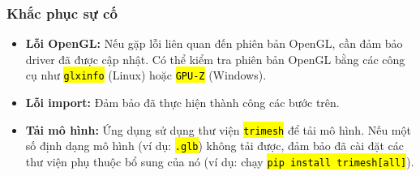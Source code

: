 \documentclass[a4paper]{article}
\newcommand{\code}[1]{\hl{\texttt{#1}}}
\begin{document}
\subsubsection{Khắc phục sự cố}
\begin{itemize}
  \item \textbf{Lỗi OpenGL:} Nếu gặp lỗi liên quan đến phiên bản OpenGL, cần đảm bảo driver đã được cập nhật. Có thể kiểm tra phiên bản OpenGL bằng các công cụ như \code{glxinfo} (Linux) hoặc \code{GPU-Z} (Windows).
  \item \textbf{Lỗi import:} Đảm bảo đã thực hiện thành công các bước trên.
  \item \textbf{Tải mô hình:} Ứng dụng sử dụng thư viện \code{trimesh} để tải mô hình. Nếu một số định dạng mô hình (ví dụ: \code{.glb}) không tải được, đảm bảo đã cài đặt các thư viện phụ thuộc bổ sung của nó (ví dụ: chạy \code{pip install trimesh[all]}).
\end{itemize}

\end{document}
